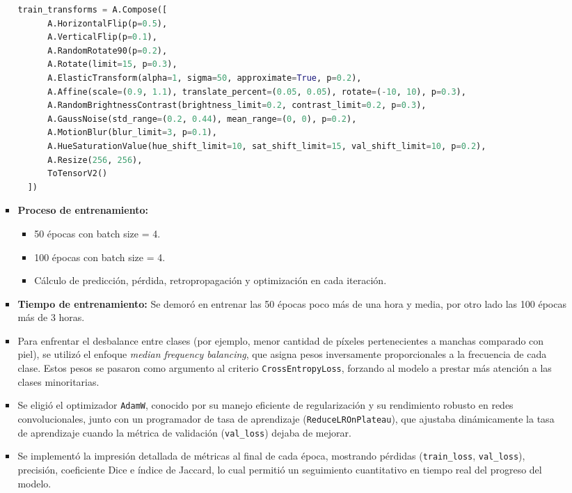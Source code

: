 \begin{enumerate}
\begin{itemize}
\begin{itemize}
\begin{lstlisting}[language=Python]
  train_transforms = A.Compose([
      A.HorizontalFlip(p=0.5),
      A.VerticalFlip(p=0.1),
      A.RandomRotate90(p=0.2),
      A.Rotate(limit=15, p=0.3),
      A.ElasticTransform(alpha=1, sigma=50, approximate=True, p=0.2),
      A.Affine(scale=(0.9, 1.1), translate_percent=(0.05, 0.05), rotate=(-10, 10), p=0.3),
      A.RandomBrightnessContrast(brightness_limit=0.2, contrast_limit=0.2, p=0.3),
      A.GaussNoise(std_range=(0.2, 0.44), mean_range=(0, 0), p=0.2),
      A.MotionBlur(blur_limit=3, p=0.1),
      A.HueSaturationValue(hue_shift_limit=10, sat_shift_limit=15, val_shift_limit=10, p=0.2),
      A.Resize(256, 256),
      ToTensorV2()
  ])
  \end{lstlisting}

  \item \textbf{Proceso de entrenamiento:}
  \begin{itemize}
    \item 50 épocas con batch size = 4.
    \item 100 épocas con batch size = 4.
    \item Cálculo de predicción, pérdida, retropropagación y optimización en cada iteración.
  \end{itemize}

  \item \textbf{Tiempo de entrenamiento:}
  Se demoró en entrenar las 50 épocas poco más de una hora y media, por otro lado las 100 épocas más de 3 horas.

\item Para enfrentar el desbalance entre clases (por ejemplo, menor cantidad de píxeles pertenecientes a manchas comparado con piel), se utilizó el enfoque \emph{median frequency balancing}, que asigna pesos inversamente proporcionales a la frecuencia de cada clase. Estos pesos se pasaron como argumento al criterio \texttt{CrossEntropyLoss}, forzando al modelo a prestar más atención a las clases minoritarias.

\item Se eligió el optimizador \texttt{AdamW}, conocido por su manejo eficiente de regularización y su rendimiento robusto en redes convolucionales, junto con un programador de tasa de aprendizaje (\texttt{ReduceLROnPlateau}), que ajustaba dinámicamente la tasa de aprendizaje cuando la métrica de validación (\texttt{val\_loss}) dejaba de mejorar.

\item Se implementó la impresión detallada de métricas al final de cada época, mostrando pérdidas (\texttt{train\_loss}, \texttt{val\_loss}), precisión, coeficiente Dice e índice de Jaccard, lo cual permitió un seguimiento cuantitativo en tiempo real del progreso del modelo.
\end{itemize}



\end{itemize}
\end{enumerate}
